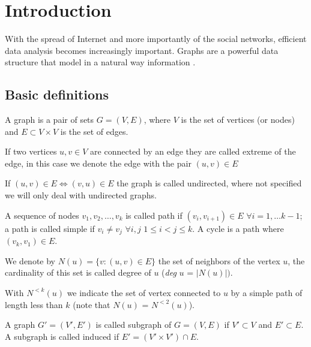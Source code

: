 
\chapter{Introduction}

With the spread of Internet and more importantly of the social networks, efficient data analysis becomes increasingly important.
Graphs are a powerful data structure that model in a natural way information . 


\section{Basic definitions}

\begin{definizione}\label{def:graph}
    A graph is a pair of sets $G=(V,E)$, where $V$ is the set of vertices (or nodes) and $E \subset V \times V$ is the set of edges.
\end{definizione}

If two vertices $u, v \in V$ are connected by an edge they are called extreme of the edge, in this case we denote the edge with the pair $(u, v) \in E$

If $(u,v) \in E \Leftrightarrow (v,u) \in E$ the graph is called undirected, where not specified we will only deal with undirected graphs.

A sequence of nodes  $v_{1}, v_{2}, \ldots, v_{k}$ is called path if $(v_{i}, v_{i+1}) \in E$ $\forall i = 1, \ldots k-1$; a path is called simple if $v_{i} \neq v_{j}$ $\forall i,j$ $1 \leq i < j \leq k$. A cycle is a path where $(v_{k}, v_{1}) \in E$.

We denote by $N(u) = \{ v : (u,v) \in E \}$ the set of neighbors of the vertex $u$, the cardinality of this set is called degree of $u$ (\textit{deg} $u$ = $|N(u)|)$. 

With $N^{<k}(u)$ we indicate the set of vertex connected to $u$ by a simple path of length less than $k$ (note that $N(u)$ = $N^{<2}(u)$).


\begin{definizione}\label{def:subgraph}
    A graph $G' = (V', E')$ is called subgraph of $G=(V,E)$ if $V' \subset V$ and $E' \subset E$. A subgraph is called induced if $E' = (V' \times V') \cap E$.
\end{definizione}


